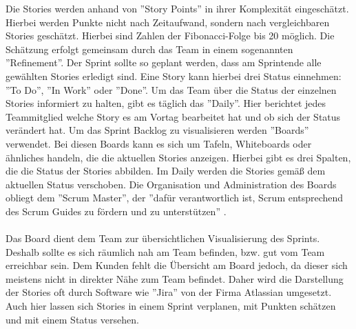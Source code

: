 \documentclass[12pt,titlepage]{scrartcl}
\begin{document}
		Die Stories werden anhand von ''Story Points'' in ihrer Komplexität eingeschätzt. Hierbei werden Punkte nicht nach Zeitaufwand, sondern nach vergleichbaren Stories geschätzt. Hierbei sind Zahlen der Fibonacci-Folge bis 20 möglich. Die Schätzung erfolgt gemeinsam durch das Team in einem sogenannten ''Refinement''. Der Sprint sollte so geplant werden, dass am Sprintende alle gewählten Stories erledigt sind. Eine Story kann hierbei drei Status einnehmen: ''To Do'', ''In Work'' oder ''Done''. Um das Team über die Status der einzelnen Stories informiert zu halten, gibt es täglich das ''Daily''. Hier berichtet jedes Teammitglied welche Story es am Vortag bearbeitet hat und ob sich der Status verändert hat. Um das Sprint Backlog zu visualisieren werden ''Boards'' verwendet. Bei diesen Boards kann es sich um Tafeln, Whiteboards oder ähnliches handeln, die die aktuellen Stories anzeigen. Hierbei gibt es drei Spalten, die die Status der Stories abbilden. Im Daily werden die Stories gemäß dem aktuellen Status verschoben. Die Organisation und Administration des Boards obliegt dem ''Scrum Master'', der ''dafür verantwortlich ist, Scrum entsprechend des Scrum Guides zu fördern	und zu unterstützen'' \cite{guide}. \\ \\
		Das Board dient dem Team zur übersichtlichen Visualisierung des Sprints. Deshalb sollte es sich räumlich nah am Team befinden, bzw. gut vom Team erreichbar sein. Dem Kunden fehlt die Übersicht am Board jedoch, da dieser sich meistens nicht in direkter Nähe zum Team befindet. Daher wird die Darstellung der Stories oft durch Software wie ''Jira'' von der Firma Atlassian umgesetzt. Auch hier lassen sich Stories in einem Sprint verplanen, mit Punkten schätzen und mit einem Status versehen.
		
\end{document}
